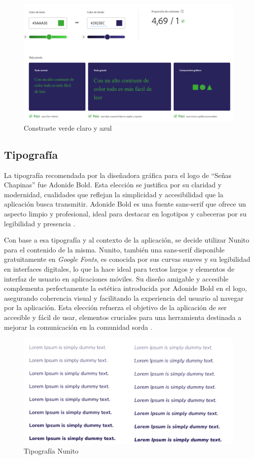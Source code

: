 \begin{itemize}
    \begin{figure} [H]
        \centering
        \includegraphics[width=0.6\linewidth]{figuras/contraste_verde_claro_azul.png}
        \caption{Constraste verde claro y azul}
        \label{fig:enter-label}
    \end{figure}
        

\end{itemize}



\subsection{Tipografía}

La tipografía recomendada por la diseñadora gráfica para el logo de ``Señas Chapinas'' fue Adonide Bold. Esta elección se justifica por su claridad y modernidad, cualidades que reflejan la simplicidad y accesibilidad que la aplicación busca transmitir. Adonide Bold es una fuente sans-serif que ofrece un aspecto limpio y profesional, ideal para destacar en logotipos y cabeceras por su legibilidad y presencia  \cite{AdonideFont}.

Con base a esa tipografía y al contexto de la aplicación, se decide utilizar Nunito para el contenido de la misma. Nunito, también una sans-serif disponible gratuitamente en \textit{Google Fonts}, es conocida por sus curvas suaves y su legibilidad en interfaces digitales, lo que la hace ideal para textos largos y elementos de interfaz de usuario en aplicaciones móviles. Su diseño amigable y accesible complementa perfectamente la estética introducida por Adonide Bold en el logo, asegurando coherencia visual y facilitando la experiencia del usuario al navegar por la aplicación. Esta elección refuerza el objetivo de la aplicación de ser accesible y fácil de usar, elementos cruciales para una herramienta destinada a mejorar la comunicación en la comunidad sorda \cite{Design2024}.

\begin{figure} [H]
    \centering
    \includegraphics[width=0.75\linewidth]{figuras/tipografia.png}
    \caption{Tipografía Nunito}
    \label{fig:enter-label}
\end{figure}

